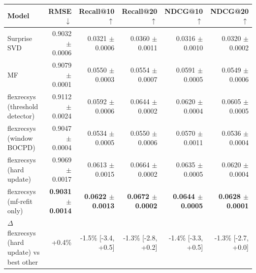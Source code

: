 \begin{tabular}{lrrrrr}
\toprule
Model & RMSE $\downarrow$ & Recall@10 $\uparrow$ & Recall@20 $\uparrow$ & NDCG@10 $\uparrow$ & NDCG@20 $\uparrow$ \\
\midrule
Surprise SVD & 0.9032 $\pm$ 0.0006 & 0.0321 $\pm$ 0.0006 & 0.0360 $\pm$ 0.0011 & 0.0316 $\pm$ 0.0010 & 0.0320 $\pm$ 0.0002 \\
MF & 0.9079 $\pm$ 0.0001 & 0.0550 $\pm$ 0.0003 & 0.0554 $\pm$ 0.0007 & 0.0591 $\pm$ 0.0005 & 0.0549 $\pm$ 0.0006 \\
flexrecsys (threshold detector) & 0.9112 $\pm$ 0.0024 & 0.0592 $\pm$ 0.0006 & 0.0644 $\pm$ 0.0002 & 0.0620 $\pm$ 0.0004 & 0.0605 $\pm$ 0.0005 \\
flexrecsys (window BOCPD) & 0.9047 $\pm$ 0.0004 & 0.0534 $\pm$ 0.0005 & 0.0550 $\pm$ 0.0006 & 0.0570 $\pm$ 0.0011 & 0.0536 $\pm$ 0.0004 \\
flexrecsys (hard update) & 0.9069 $\pm$ 0.0017 & 0.0613 $\pm$ 0.0015 & 0.0664 $\pm$ 0.0002 & 0.0635 $\pm$ 0.0005 & 0.0620 $\pm$ 0.0004 \\
flexrecsys (mf-refit only) & \textbf{0.9031 $\pm$ 0.0014} & \textbf{0.0622 $\pm$ 0.0013} & \textbf{0.0672 $\pm$ 0.0002} & \textbf{0.0644 $\pm$ 0.0005} & \textbf{0.0628 $\pm$ 0.0001} \\
\midrule
$\Delta$ flexrecsys (hard update) vs best other & +0.4\% & -1.5\% [-3.4, +0.5] & -1.3\% [-2.8, +0.2] & -1.4\% [-3.3, +0.5] & -1.3\% [-2.7, +0.0] \\
\bottomrule
\end{tabular}

